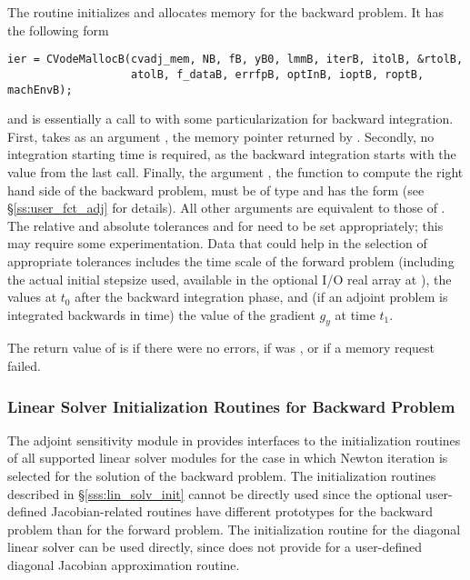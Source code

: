 The routine  initializes and allocates memory for the backward
problem. It has the following form
\begin{verbatim}
ier = CVodeMallocB(cvadj_mem, NB, fB, yB0, lmmB, iterB, itolB, &rtolB, 
                   atolB, f_dataB, errfpB, optInB, ioptB, roptB, machEnvB);
\end{verbatim}
and is essentially a call to  with some particularization for 
backward integration. First,  takes as an argument 
, the memory pointer returned by .
Secondly, no integration starting time is required, as the backward integration 
starts with the  value from the last  call. Finally, the 
argument , the {\C} function to compute the right hand side of the 
backward problem, must be of type  and
has the form  
(see \S\ref{ss:user_fct_adj} for details). 
All other arguments are equivalent to those of .
The relative and absolute tolerances  and  for  need
to be set appropriately; this may require some experimentation. Data that could
help in the selection of appropriate tolerances includes the time scale of the
forward problem (including the actual initial stepsize used, available in the
optional I/O real array at ), the  values at $t_0$ after
the backward integration phase, and (if an adjoint problem is integrated 
backwards in time) the value of the gradient $g_y$ at time $t_1$.

The return value of  is  if there were no errors,
 if  was , or 
if a memory request failed.

\subsubsection{Linear Solver Initialization Routines for Backward Problem}\label{sss:lin_solv_b}

The adjoint sensitivity module in {\cvodes} provides interfaces to the initialization
routines of all supported linear solver modules for the case in which Newton
iteration is selected for the solution of the backward problem. The initialization
routines described in \S\ref{sss:lin_solv_init} cannot be directly used since the
optional user-defined Jacobian-related routines have different prototypes for the
backward problem than for the forward problem. The initialization routine
 for the diagonal linear solver can be used directly, since {\cvdiag}
does not provide for a user-defined diagonal Jacobian approximation routine. 

